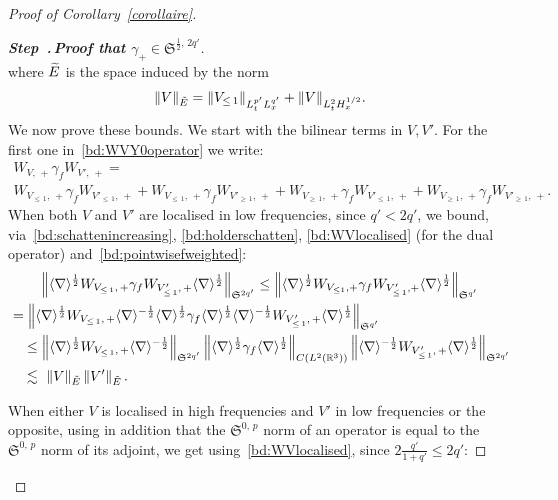 \documentclass[10pt]{amsart}
\theoremstyle{definition}\newtheorem{defi}[theo]{Definition}\newtheorem{rema}[theo]{Remark}\newtheorem{exam}[theo]{Example}\newtheorem{exem}[theo]{Example}\newtheorem{nota}[theo]{Notation}
\newcommand{\R}{\mathbb{R}}
\newcommand{\frkS}{\mathfrak{S}}
\newcounter{stepcount}
\newenvironment{step}[1]{\refstepcounter{stepcount}\begin{proof}[{\bf{Step~\thestepcount}{.\,\emph{#1}}}]}{\let\qed\relax\end{proof}}
\let\oldtilde\tilde
\renewcommand*{\tilde}[1]{\mathchoice{\widetilde{#1}}{\widetilde{#1}}{\oldtilde{#1}}{\oldtilde{#1}}}
\begin{document}
\begin{proof}[Proof of Corollary~\ref{corollaire}]
\begin{step}{{Proof that $\gamma_+\in \frkS^{\frac 12,\,2q'}$}}
\begin{equation}
\end{equation}
where $\tilde E$ is the space induced by the norm
\[
\|V\|_{\tilde E} = \left\|V_{\leq\,1}\right\|_{L^{p'}_tL^{q'}_x} + \|V\|_{L^2_tH^{1/2}_x}.
\]
We now prove these bounds. We start with the bilinear terms in $V,V'$. For the first one in~\eqref{bd:WVY0operator} we write:
\begin{multline*}
W_{V,\,+}\gamma_f W_{V',\,+} = \\
W_{V_{\leq\,1},\,+}\gamma_f W_{V'_{\leq\,1},\,+}+W_{V_{\leq\,1},\,+}\gamma_f W_{V'_{\geq\,1},\,+}+W_{V_{\geq\,1},\,+}\gamma_f W_{V'_{\leq\,1},\,+}+W_{V_{\geq\,1},\,+}\gamma_f W_{V'_{\geq\,1},\,+}.
\end{multline*}
When both $V$ and $V'$ are localised in low frequencies, since $q'<2q'$, we bound, via~\eqref{bd:schattenincreasing}, \eqref{bd:holderschatten}, \eqref{bd:WVlocalised} (for the dual operator) and~\eqref{bd:pointwisefweighted}:
\begin{multline*}
\left\| \langle \nabla \rangle^{\frac 12} W_{V_{\leq\, 1},\,+}\gamma_f W_{V'_{\leq\,1},\,+}\langle \nabla \rangle^{\frac 12} \right\|_{\frkS^{2q'}} \leq \left\| \langle \nabla \rangle^{\frac 12} W_{V_{\leq 1},+}\gamma_f W_{V'_{\leq\,1},+}\langle \nabla \rangle^{\frac 12}\right\|_{\frkS^{q'}} \\
\begin{aligned}
&=\left\| \langle \nabla \rangle^{\frac 12} W_{V_{\leq\,1},\,+}\langle \nabla \rangle^{-\frac 12}\langle \nabla \rangle^{\frac 12} \gamma_f\langle \nabla \rangle^{\frac 12} \langle \nabla \rangle^{-\frac 12} W_{V'_{\leq\,1},\,+}\langle \nabla \rangle^{\frac 12} \right\|_{\frkS^{q'}}\\
&\quad \leq \left\| \langle \nabla \rangle^{\frac 12} W_{V_{\leq\,1},\,+}\langle \nabla \rangle^{-\frac 12}\right\|_{\frkS^{2q'}} \left\|\langle \nabla \rangle^{\frac 12} \gamma_f\langle \nabla \rangle^{\frac 12}\right\|_{C\left(L^2\left(\R^3\right)\right)} \left\| \langle \nabla \rangle^{-\frac 12} W_{V'_{\leq\,1},\,+}\langle \nabla \rangle^{\frac 12} \right\|_{\frkS^{2q'}} \\
&\quad \lesssim \ \| V\|_{\tilde E}\left\| V'\right\|_{\tilde E}.
\end{aligned}
\end{multline*}

When either $V$ is localised in high frequencies and $V'$ in low frequencies or the opposite, using in addition that the $\frkS^{0,\,p}$ norm of an operator is equal to the $\frkS^{0,\,p}$ norm of its adjoint, we get using~\eqref{bd:WVlocalised}, since $2 \frac{q'}{1+q'} \leq 2q'$:


\end{step}
\end{proof}
\end{document}
